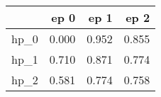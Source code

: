 \begin{tabular}{lrrr}
\toprule
{} &   ep 0 &   ep 1 &   ep 2 \\
\midrule
hp\_0 &  0.000 &  0.952 &  0.855 \\
hp\_1 &  0.710 &  0.871 &  0.774 \\
hp\_2 &  0.581 &  0.774 &  0.758 \\
\bottomrule
\end{tabular}
